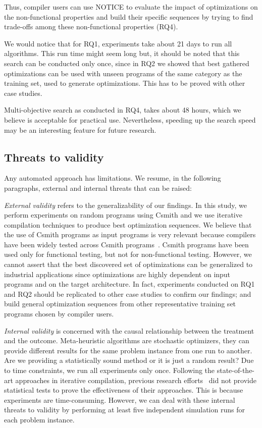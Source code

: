 Thus, compiler users can use NOTICE to evaluate the impact of optimizations on the non-functional properties and build their specific sequences by trying to find trade-offs among these non-functional properties (RQ4). 

We would notice that for RQ1, experiments take about 21 days to run all algorithms. This run time might seem long but, it should be noted that this search can be conducted only once, since in RQ2 we showed that best gathered optimizations can be used with unseen programs of the same category as the training set, used to generate optimizations. This has to be proved with other case studies. 

Multi-objective search as conducted in RQ4, takes about 48 hours, which we believe is acceptable for practical use. Nevertheless, speeding up the search speed may be an interesting feature for future research.
		
\subsection{Threats to validity}
Any automated approach has limitations. We resume, in the following paragraphs, external and internal threats that can be raised:
		
\textit{External validity} refers to the generalizability of our findings. In this study, we perform experiments on random programs using Csmith and we use iterative compilation techniques to produce best optimization sequences. We believe that the use of Csmith programs as input programs is very relevant because compilers have been widely tested across Csmith programs~\cite{chen2016empirical,yang2011finding}. Csmith programs have been used only for functional testing, but not for non-functional testing. However, we cannot assert that the best discovered set of optimizations can be generalized to industrial applications since optimizations are highly dependent on input programs and on the target architecture. In fact, experiments conducted on RQ1 and RQ2 should be replicated to other case studies to confirm our findings; and build general optimization sequences from other representative training set programs chosen by compiler users.
		
\textit{Internal validity} is concerned with the causal relationship between the treatment and the outcome. Meta-heuristic algorithms are stochastic optimizers, they can provide different results for the same problem instance from one run to another. Are we providing a statistically sound method or it is just a random result? Due to time constraints, we run all experiments only once. Following the state-of-the-art approaches in iterative compilation, previous research efforts~\cite{hoste2008cole,martinez2014multi} did not provide statistical tests to prove the effectiveness of their approaches. This is because experiments are time-consuming. However, we can deal with these internal threats to validity by performing at least five independent simulation runs for each problem instance. 
		
